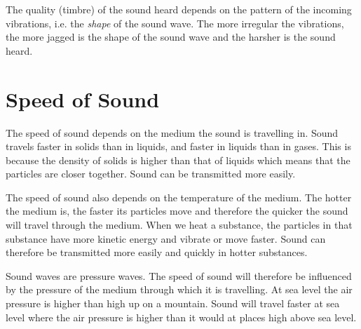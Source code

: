 The quality (timbre) of the sound heard depends on the pattern of the incoming vibrations, i.e. the \textit{shape} of the sound wave. The more irregular the vibrations, the more jagged is the shape of the sound wave and the harsher is the sound heard.

\section{Speed of Sound}
The speed of sound depends on the medium the sound is travelling in. Sound travels faster in solids than in liquids, and faster in liquids than in gases. This is because the density of solids is higher than that of liquids which means that the particles are closer together. Sound can be transmitted more easily.

The speed of sound also depends on the temperature of the medium. The hotter the medium is, the faster its particles move and therefore the quicker the sound will travel through the medium. When we heat a substance, the particles in that substance have more kinetic energy and vibrate or move faster. Sound can therefore be transmitted more easily and quickly in hotter substances.

Sound waves are pressure waves. The speed of sound will therefore be influenced by the pressure of the medium through which it is travelling. At sea level the air pressure is higher than high up on a mountain. Sound will travel faster at sea level where the air pressure is higher than it would at places high above sea level.

\pagebreak
{}\\
